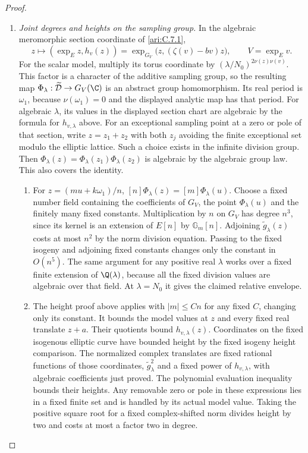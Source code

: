 \begin{proof}
\begin{enumerate}[label=\arabic*.,leftmargin=0pt,labelsep=.5em]
\item \emph{Joint degrees and heights on the sampling group.}
In the algebraic meromorphic section coordinate of
\ref{ari:C.7.1},
\[
 z\longmapsto(\exp_Ez,h_v(z))
   =\exp_{G_V}\bigl(z,(\zeta(v)-bv)z\bigr),\qquad
 V=\exp_Ev.
\]
For the scalar model, multiply its torus coordinate by
$(\lambda/N_0)^{2\nu(z)\nu(v)}$. This factor is a character
of the additive sampling group, so the resulting map
$\Phi_\lambda:\widetilde{\mathcal D}\to G_V(\C)$ is an
abstract group homomorphism. Its real period is $\omega_1$,
because $\nu(\omega_1)=0$ and the displayed analytic map
has that period. For algebraic $\lambda$, its values in the displayed section
chart are algebraic by the formula for $h_{v,\lambda}$ above.
For an exceptional sampling point at a zero or pole of that
section, write $z=z_1+z_2$ with both $z_j$ avoiding the finite
exceptional set modulo the elliptic lattice. Such a choice exists
in the infinite division group. Then
$\Phi_\lambda(z)=\Phi_\lambda(z_1)\Phi_\lambda(z_2)$ is
algebraic by the algebraic group law. This also covers the identity.


\begin{enumerate}[label={$\langle2\rangle$\arabic*.},leftmargin=1.3em,labelsep=.5em]
\item  For $z=(mu+k\omega_1)/n$,
$[n]\Phi_\lambda(z)=[m]\Phi_\lambda(u)$.
Choose a fixed number field containing the coefficients of
$G_V$, the point $\Phi_\lambda(u)$ and the finitely many
fixed constants. Multiplication by $n$ on $G_V$ has degree
$n^3$, since its kernel is an extension of $E[n]$ by
$\mathbb G_m[n]$. Adjoining $\widetilde g_\lambda(z)$ costs
at most $n^2$ by the norm division equation. Passing to the
fixed isogeny and adjoining fixed constants changes only the
constant in $O(n^5)$. The same argument for any positive real
$\lambda$ works over a fixed finite extension of $\Q(\lambda)$,
because all the fixed division values are algebraic over that
field. At $\lambda=N_0$ it gives the claimed relative envelope.


\item  The height proof above applies with $|m|\le Cn$ for any fixed
$C$, changing only its constant. It bounds the model values at
$z$ and every fixed real translate $z+a$. Their quotients bound
$h_{v,\lambda}(z)$. Coordinates on the fixed isogenous elliptic
curve have bounded height by the fixed isogeny height comparison.
The normalized complex translates are fixed rational functions
of those coordinates, $\widetilde g_\lambda^2$ and a fixed power
of $h_{v,\lambda}$, with algebraic coefficients just proved.
The polynomial evaluation inequality bounds their heights.
Any removable zero or pole in these expressions lies in a fixed
finite set and is handled by its actual model value. Taking the
positive square root for a fixed complex-shifted norm divides
height by two and costs at most a factor two in degree.


\end{enumerate}
\end{enumerate}
\end{proof}
